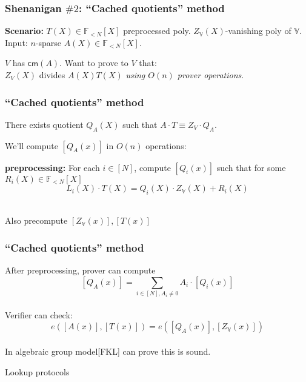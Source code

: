 \documentclass[shadesubsections,compress,14pt,mathserif]{beamer}
\newcommand{\F}{\ensuremath{{\mathbb F}}}
\newcommand{\enc}[1]{\ensuremath{\left[#1\right ]}}
\newcommand{\kzg}[1]{\ensuremath{\enc{#1(x)}}}
\newcommand{\cm}{\ensuremath{\mathsf{cm}}}
\newcommand{\polysofdeg}[1]{\F_{< #1}[X]}
\newcommand{\nl}{\\ \pause \vspace{0.2in}}
\newcommand{\bigspace}{\ensuremath{\mathbb{V}}}
\begin{document}
\begin{frame}
 \frametitle{Shenanigan $\#2$: ``Cached quotients'' method}
 \textbf{Scenario:}
$T(X)\in \polysofdeg{N}$ preprocessed poly.
$Z_\bigspace(X)$-vanishing poly of $\bigspace$.\\
Input: $n$-sparse $A(X)\in\polysofdeg{N}$.\nl

$V$ has $\cm(A)$. Want to prove to $V$ that:\\
$Z_V(X)$ divides $A(X)T(X)$ \textit{using $O(n)$ prover operations}.

\end{frame}
\begin{frame}
\frametitle{``Cached quotients'' method}
There exists quotient $Q_A(X)$ such that $A\cdot T\equiv Z_V\cdot Q_A$.\nl

We'll compute $\kzg{Q_A}$ in $O(n)$ operations:\nl


\textbf{preprocessing:}
For each $i\in [N]$, compute $\kzg{Q_i}$ such that for some $R_i(X)\in \polysofdeg{N}$
\[L_i(X)\cdot T(X) = Q_i(X)\cdot Z_\bigspace(X) +R_i(X)\]\nl

Also precompute $\kzg{Z_\bigspace},\kzg{T}$
\end{frame}
\begin{frame}
\frametitle{``Cached quotients'' method}
After preprocessing, prover can compute
\[\kzg{Q_A}=\sum_{i\in [N],A_i\neq 0} A_i \cdot \kzg{Q_i}\]\nl
Verifier can check:
\[e(\kzg{A},\kzg{T})=e(\kzg{Q_A},\kzg{Z_{\bigspace}})\]\nl
In algebraic group model[FKL] can prove this is sound.
\end{frame}



\begin{frame}
{\huge{Lookup protocols}}
 \end{frame}
\end{document}
